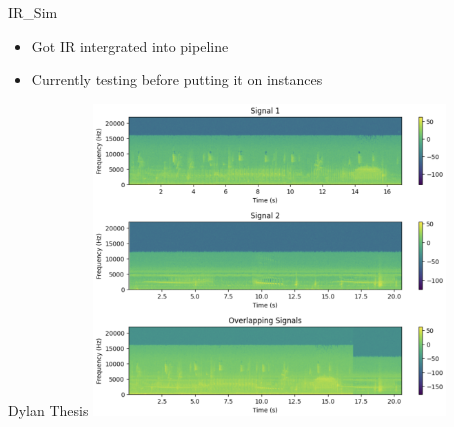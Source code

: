 \begin{frame}{IR_Sim}
    \begin{itemize}
        \item Got IR intergrated into pipeline
        \item Currently testing before putting it on instances
    \end{itemize}    
\end{frame}

\begin{frame}{Dylan Thesis}
    \centering
    \includegraphics[height=0.7\textheight,width=0.7\textwidth,keepaspectratio]{dylan-aid-1-24.png}
\end{frame}









